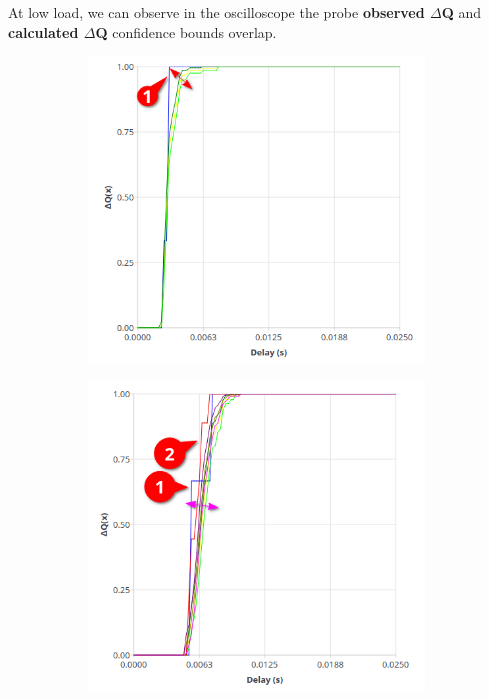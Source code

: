     At low load, we can observe in the oscilloscope the probe \textbf{observed $\Delta$Q} and \textbf{calculated $\Delta$Q} confidence bounds overlap. 
        \begin{figure}[H]
            \centering
            \begin{subfigure}{.5\textwidth}
                \centering
                \includegraphics[width=0.98\textwidth]{img/overload_2/50_workeran.png}
                \label{fig:norm_ex_1}
            \end{subfigure}%
            \begin{subfigure}{.5\textwidth}
                \centering
                \includegraphics[width =0.98\textwidth]{img/overload_2/50_probe2.png}

\end{subfigure}
\end{figure}

